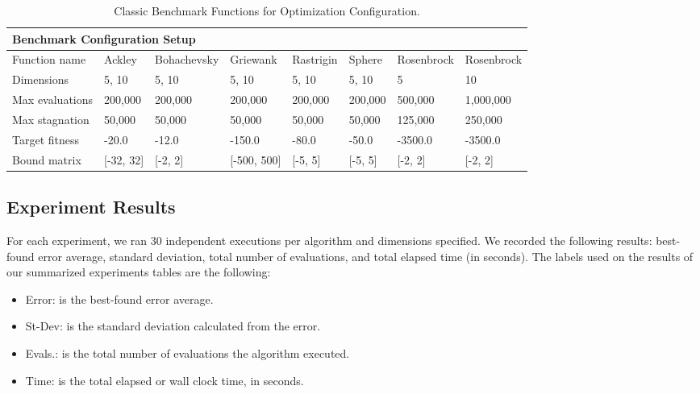 \documentclass[graybox]{svmult}
\begin{document}
        \begin{table}[]
            \scriptsize
            \centering
            \caption{Classic Benchmark Functions for Optimization Configuration.}\label{tab.benchmark_fun_config}
            \begin{tabular}{@{}llllllll@{}}
            \toprule
            \multicolumn{8}{l}{\textbf{Benchmark Configuration Setup}} \\ \midrule
            Function name & Ackley & Bohachevsky & Griewank & Rastrigin & Sphere & Rosenbrock & Rosenbrock \\
            Dimensions & 5, 10 & 5, 10 & 5, 10 & 5, 10 & 5, 10 & 5 & 10 \\
            Max evaluations & 200,000 & 200,000 & 200,000 & 200,000 & 200,000 & 500,000 & 1,000,000 \\
            Max stagnation & 50,000 & 50,000 & 50,000 & 50,000 & 50,000 & 125,000 & 250,000 \\
            Target fitness & -20.0 & -12.0 & -150.0 & -80.0 & -50.0 & -3500.0 & -3500.0 \\
            Bound matrix & {[}-32, 32{]} & {[}-2, 2{]} & {[}-500, 500{]} & {[}-5, 5{]} & {[}-5, 5{]} & {[}-2, 2{]} & {[}-2, 2{]} \\ \bottomrule
            \end{tabular}
            \end{table}
        
        \FloatBarrier


    \subsection{Experiment Results}

        For each experiment, we ran 30 independent executions per algorithm and
        dimensions specified. We recorded the following results: best-found error average,
        standard deviation, total number of evaluations, and total elapsed time (in
        seconds). The labels used on the results of our summarized experiments tables
        are the following:

        \begin{itemize}
            \item   Error:       is the best-found error average.
            \item   St-Dev:      is the standard deviation calculated from the error. 
            \item   Evals.:      is the total number of evaluations the algorithm executed.
            \item   Time:        is the total elapsed or wall clock time, in seconds. 
        \end{itemize}
\end{document}

